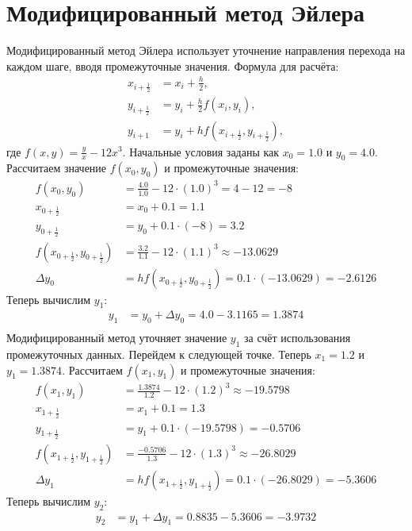 \documentclass[a4paper,12pt]{article}
\begin{document}
\section*{Модифицированный метод Эйлера}
Модифицированный метод Эйлера использует уточнение направления перехода на каждом шаге, вводя промежуточные значения. Формула для расчёта:
\begin{align*}
    x_{i+\frac{1}{2}} &= x_i + \frac{h}{2},\\
    y_{i+\frac{1}{2}} &= y_i + \frac{h}{2}f(x_i, y_i),\\
    y_{i+1} &= y_i + h f(x_{i+\frac{1}{2}}, y_{i+\frac{1}{2}}),
\end{align*}
где $f(x, y) = \frac{y}{x} - 12x^3$.
Начальные условия заданы как $x_0 = 1.0$ и $y_0 = 4.0$. Рассчитаем значение $f(x_0, y_0)$ и промежуточные значения:
\begin{align*}
    f(x_0, y_0) &= \frac{4.0}{1.0} - 12 \cdot (1.0)^3 = 4 - 12 = -8 \\
    x_{0+\frac{1}{2}} &= x_0 + 0.1 = 1.1\\
    y_{0+\frac{1}{2}} &= y_0 + 0.1 \cdot (-8) = 3.2\\
    f(x_{0+\frac{1}{2}}, y_{0+\frac{1}{2}}) &= \frac{3.2}{1.1} - 12 \cdot (1.1)^3 \approx -13.0629 \\
    \Delta{y_0} &= hf(x_{0+\frac{1}{2}}, y_{0+\frac{1}{2}}) = 0.1 \cdot (-13.0629) = -2.6126
\end{align*}
Теперь вычислим $y_1$:
\begin{align*}
    y_1 &= y_0 + \Delta{y_0} = 4.0 - 3.1165 = 1.3874\\
\end{align*}
Модифицированный метод уточняет значение $y_1$ за счёт использования промежуточных данных. Перейдем к следующей точке. Теперь $x_1 = 1.2$ и $y_1 = 1.3874$. Рассчитаем $f(x_1, y_1)$ и промежуточные значения:
\begin{align*}
    f(x_1, y_1) &= \frac{1.3874}{1.2} - 12 \cdot (1.2)^3 \approx -19.5798\\
    x_{1+\frac{1}{2}} &= x_1 + 0.1 = 1.3\\
    y_{1+\frac{1}{2}} &= y_1 + 0.1 \cdot (-19.5798) = -0.5706\\
    f(x_{1+\frac{1}{2}}, y_{1+\frac{1}{2}}) &= \frac{-0.5706}{1.3} - 12 \cdot (1.3)^3 \approx -26.8029 \\
    \Delta{y_1} &= hf(x_{1+\frac{1}{2}}, y_{1+\frac{1}{2}}) = 0.1 \cdot (-26.8029) = -5.3606
\end{align*}
Теперь вычислим $y_2$:
\begin{align*}
    y_2 &= y_1 + \Delta{y_1} = 0.8835 - 5.3606 = -3.9732\\
\end{align*}
\end{document}
